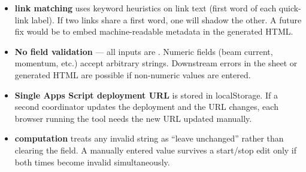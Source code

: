 \begin{itemize}
    \item \textbf{ link matching} uses keyword heuristics
          on link text (first word of each quick-link label). If two links
          share a first word, one will shadow the other. A future fix would
          be to embed machine-readable metadata in the generated HTML.

    \item \textbf{No field validation} --- all inputs are .
          Numeric fields (beam current, momentum, etc.) accept arbitrary
          strings. Downstream errors in the sheet or generated HTML are
          possible if non-numeric values are entered.

    \item \textbf{Single Apps Script deployment URL} is stored in
          localStorage. If a second coordinator updates the deployment and
          the URL changes, each browser running the tool needs the new URL
          updated manually.

    \item \textbf{ computation} treats any invalid
           string as ``leave unchanged'' rather than clearing the
          field. A manually entered value survives a start/stop edit only if
          both times become invalid simultaneously.
\end{itemize}


